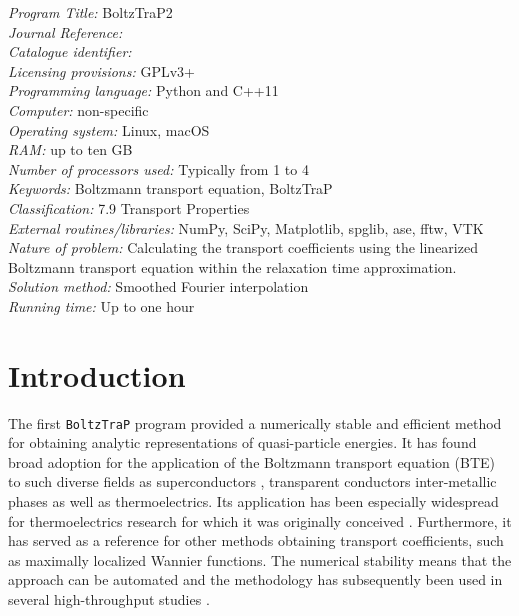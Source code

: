 \documentclass[final,5p,times,twocolumn,sort&compress]{elsarticle}
\begin{document}
\begin{small}
  \noindent%
      {\em Program Title:} BoltzTraP2\\
      {\em Journal Reference:}\\
      {\em Catalogue identifier:}\\
      {\em Licensing provisions:} GPLv3+\\
      {\em Programming language:} Python and C++11\\
      {\em Computer:} non-specific\\
      {\em Operating system:} Linux, macOS\\
      {\em RAM:} up to ten GB\\
      {\em Number of processors used:} Typically from 1 to 4\\
      {\em Keywords:} Boltzmann transport equation, BoltzTraP \\
      {\em Classification:} 7.9 Transport Properties\\
      {\em External routines/libraries:} NumPy, SciPy, Matplotlib, spglib, ase, fftw, VTK\\
      {\em Nature of problem:} Calculating the transport coefficients using the linearized Boltzmann transport equation within the relaxation time approximation.\\
      {\em Solution method:} Smoothed Fourier interpolation\\
      {\em Running time:} Up to one hour\\
\end{small}

\section{Introduction}
The first \texttt{BoltzTraP} program \cite{BoltzTraP} provided a numerically stable and efficient method for obtaining analytic representations of quasi-particle energies. It has found broad adoption for the application of the Boltzmann transport equation (BTE) to such diverse fields as superconductors \cite{Singh_PRL08}, transparent conductors \cite{Hautier_NatComm13} inter-metallic phases \cite{Dolinsek_PRB09} as well as thermoelectrics. Its application has been especially widespread for thermoelectrics research \cite{May_PRB09,Ouardi_PRB10,Parker_PRL13,Luo_JMCA14,Kim_NL15,Hong_SciRep16,He_PRL16,Zhang_NatComm16} for which it was originally conceived \cite{Madsen_PRB03,Madsen_JACS06}. Furthermore, it has served as a reference for other methods obtaining transport coefficients, such as maximally localized Wannier functions.\cite{Yates_PRB07,Pizzi_CPC14} The numerical stability means that the approach can be automated \cite{Madsen_JACS06} and the methodology has subsequently been used in several high-throughput studies \cite{Madsen_JACS06,Hautier_NatComm13,Carrete_AFM14,Bhattacharya_PRB15,Zhu_JMCC15}.
\end{document}
